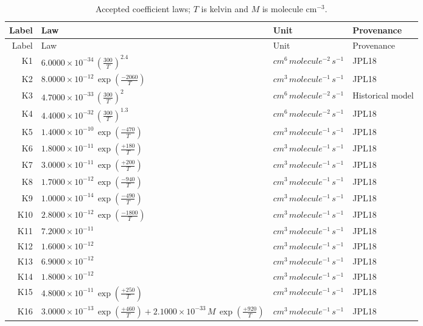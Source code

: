 \begin{longtable}{rp{}p{}l}\caption{Accepted coefficient laws; $T$ is kelvin and $M$ is molecule cm$^{-3}$.}\label{tab:rates}\\\toprule Label & Law & Unit & Provenance\\\midrule\endfirsthead\toprule Label & Law & Unit & Provenance\\\midrule\endhead\bottomrule\endfoot
K1 & $6.0000\times10^{-34}\,\left(\frac{300}{T}\right)^{2.4}$ & $cm^6\,molecule^{-2}\,s^{-1}$ & JPL18\\
K2 & $8.0000\times10^{-12}\,\exp\left(\frac{-2060}{T}\right)$ & $cm^3\,molecule^{-1}\,s^{-1}$ & JPL18\\
K3 & $4.7000\times10^{-33}\,\left(\frac{300}{T}\right)^{2}$ & $cm^6\,molecule^{-2}\,s^{-1}$ & Historical model\\
K4 & $4.4000\times10^{-32}\,\left(\frac{300}{T}\right)^{1.3}$ & $cm^6\,molecule^{-2}\,s^{-1}$ & JPL18\\
K5 & $1.4000\times10^{-10}\,\exp\left(\frac{-470}{T}\right)$ & $cm^3\,molecule^{-1}\,s^{-1}$ & JPL18\\
K6 & $1.8000\times10^{-11}\,\exp\left(\frac{+180}{T}\right)$ & $cm^3\,molecule^{-1}\,s^{-1}$ & JPL18\\
K7 & $3.0000\times10^{-11}\,\exp\left(\frac{+200}{T}\right)$ & $cm^3\,molecule^{-1}\,s^{-1}$ & JPL18\\
K8 & $1.7000\times10^{-12}\,\exp\left(\frac{-940}{T}\right)$ & $cm^3\,molecule^{-1}\,s^{-1}$ & JPL18\\
K9 & $1.0000\times10^{-14}\,\exp\left(\frac{-490}{T}\right)$ & $cm^3\,molecule^{-1}\,s^{-1}$ & JPL18\\
K10 & $2.8000\times10^{-12}\,\exp\left(\frac{-1800}{T}\right)$ & $cm^3\,molecule^{-1}\,s^{-1}$ & JPL18\\
K11 & $7.2000\times10^{-11}$ & $cm^3\,molecule^{-1}\,s^{-1}$ & JPL18\\
K12 & $1.6000\times10^{-12}$ & $cm^3\,molecule^{-1}\,s^{-1}$ & JPL18\\
K13 & $6.9000\times10^{-12}$ & $cm^3\,molecule^{-1}\,s^{-1}$ & JPL18\\
K14 & $1.8000\times10^{-12}$ & $cm^3\,molecule^{-1}\,s^{-1}$ & JPL18\\
K15 & $4.8000\times10^{-11}\,\exp\left(\frac{+250}{T}\right)$ & $cm^3\,molecule^{-1}\,s^{-1}$ & JPL18\\
K16 & $3.0000\times10^{-13}\,\exp\left(\frac{+460}{T}\right)+2.1000\times10^{-33}\,M\,\exp\left(\frac{+920}{T}\right)$ & $cm^3\,molecule^{-1}\,s^{-1}$ & JPL18\\

\end{longtable}
